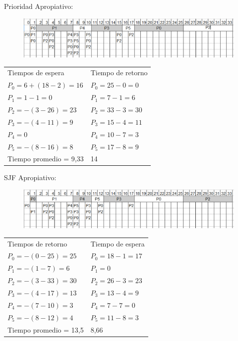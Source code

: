 \documentclass[a4paper]{article}
\begin{document}
Prioridad Apropiativo:\\
\begin{figure}[!htb]
\includegraphics[scale=0.60]{Prioridad-Apropiativo.eps}
\end{figure}
\begin{tabular}{l l}
Tiempos de espera 		 & Tiempo de retorno\\
$P_0 = 6+(18 - 2)= 16$   & $P_0 = 25-0 = 0$ \\
$P_1 = 1 - 1= 0$ 		 & $P_1 = 7-1= 6$ \\
$P_2 =-(3 - 26)= 23$ 	 & $P_2 = 33-3= 30$\\
$P_3 =-(4 - 11)= 9$ 	 & $P_3 = 15-4= 11$\\
$P_4 = 0$ 				 & $P_4 = 10-7= 3$\\
$P_5 =-(8 - 16)= 8$ 	 & $P_5 = 17-8= 9$\\
Tiempo promedio = 9,33 	 & 14
\end{tabular}
\newline
SJF Apropiativo:\\
\begin{figure}[!htb]
\includegraphics[scale=0.60]{SJF-Apropiativo.eps}
\end{figure}
\begin{tabular}{l l}
Tiempos de retorno 		& Tiempo de espera\\
$P_0 =-(0 - 25)= 25$   	& $P_0 = 18-1= 17$ \\
$P_1 =-(1 - 7)= 6$ 		& $P_1 = 0$ \\
$P_2 =-(3 - 33)= 30$ 	& $P_2 = 26-3= 23$\\
$P_3 =-(4 - 17)= 13$ 	& $P_3 = 13-4= 9$\\
$P_4 =-(7 - 10)= 3$ 	& $P_4 = 7-7= 0$\\
$P_5 =-(8 - 12)= 4$ 	& $P_5 = 11-8= 3$\\
Tiempo promedio = 13,5 	& 8,66
\end{tabular}
\newline
\newline
\end{document}
